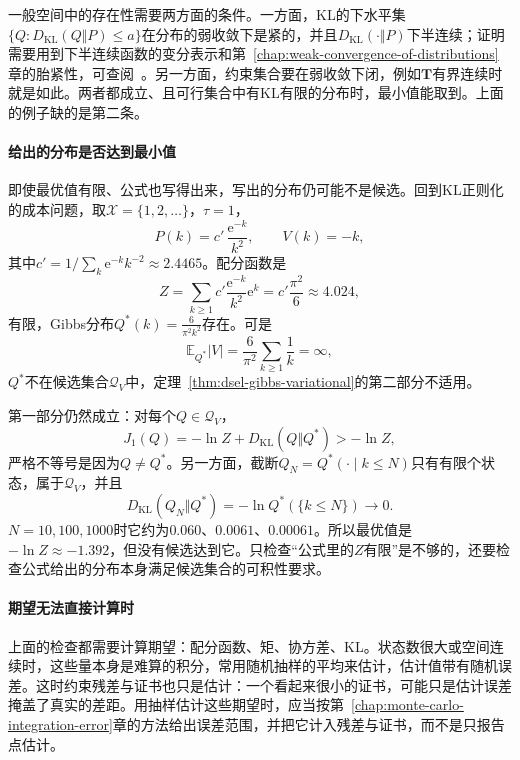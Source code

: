 一般空间中的存在性需要两方面的条件。一方面，KL的下水平集$\{Q:D_{\mathrm{KL}}(Q\Vert P)\leq a\}$在分布的弱收敛下是紧的，并且$D_{\mathrm{KL}}(\cdot\Vert P)$下半连续；证明需要用到下半连续函数的变分表示和第~\ref{chap:weak-convergence-of-distributions}章的胎紧性，可查阅~。另一方面，约束集合要在弱收敛下闭，例如$\bm{T}$有界连续时就是如此。两者都成立、且可行集合中有KL有限的分布时，最小值能取到。上面的例子缺的是第二条。

\paragraph{给出的分布是否达到最小值}
即使最优值有限、公式也写得出来，写出的分布仍可能不是候选。回到KL正则化的成本问题，取$\mathcal{X}=\{1,2,\dots\}$，$\tau=1$，
\[
 P(k)=c'\,\frac{\mathrm{e}^{-k}}{k^{2}},\qquad V(k)=-k ,
\]
其中$c'=1/\sum_k\mathrm{e}^{-k}k^{-2}\approx2.4465$。配分函数是
\[
 Z=\sum_{k\geq1}c'\frac{\mathrm{e}^{-k}}{k^{2}}\mathrm{e}^{k}=c'\frac{\pi^{2}}{6}\approx4.024 ,
\]
有限，Gibbs分布$Q^{*}(k)=\frac{6}{\pi^{2}k^{2}}$存在。可是
\[
 \mathbb{E}_{Q^{*}}\lvert V\rvert=\frac{6}{\pi^{2}}\sum_{k\geq1}\frac1k=\infty ,
\]
$Q^{*}$不在候选集合$\mathcal{Q}_V$中，定理~\ref{thm:dsel-gibbs-variational}的第二部分不适用。

第一部分仍然成立：对每个$Q\in\mathcal{Q}_V$，
\[
 J_1(Q)=-\ln Z+D_{\mathrm{KL}}(Q\Vert Q^{*})>-\ln Z ,
\]
严格不等号是因为$Q\neq Q^{*}$。另一方面，截断$Q_N=Q^{*}(\cdot\mid k\leq N)$只有有限个状态，属于$\mathcal{Q}_V$，并且
\[
 D_{\mathrm{KL}}(Q_N\Vert Q^{*})=-\ln Q^{*}(\{k\leq N\})\to0 .
\]
$N=10,100,1000$时它约为$0.060$、$0.0061$、$0.00061$。所以最优值是$-\ln Z\approx-1.392$，但没有候选达到它。只检查“公式里的$Z$有限”是不够的，还要检查公式给出的分布本身满足候选集合的可积性要求。

\paragraph{期望无法直接计算时}
上面的检查都需要计算期望：配分函数、矩、协方差、KL。状态数很大或空间连续时，这些量本身是难算的积分，常用随机抽样的平均来估计，估计值带有随机误差。这时约束残差与证书也只是估计：一个看起来很小的证书，可能只是估计误差掩盖了真实的差距。用抽样估计这些期望时，应当按第~\ref{chap:monte-carlo-integration-error}章的方法给出误差范围，并把它计入残差与证书，而不是只报告点估计。
